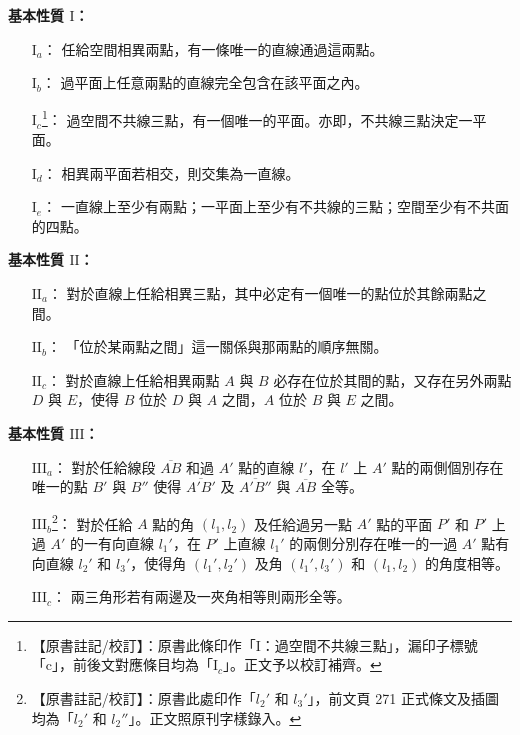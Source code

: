 \noindent\textbf{基本性質 $\mathrm{I}$：}
\begin{itemize}[leftmargin=2.8em, itemsep=0.2em]
  \item[$\mathrm{I}_a$：]任給空間相異兩點，有一條唯一的直線通過這兩點。
  \item[$\mathrm{I}_b$：]過平面上任意兩點的直線完全包含在該平面之內。
  \item[$\mathrm{I}_c$\phantomsection\label{note:b3-a1-p277-ic}\footnote{【原書註記/校訂】：原書此條印作「$\mathrm{I}$：過空間不共線三點」，漏印子標號「c」，前後文對應條目均為「$\mathrm{I}_c$」。正文予以校訂補齊。}：]過空間不共線三點，有一個唯一的平面。亦即，不共線三點決定一平面。
  \item[$\mathrm{I}_d$：]相異兩平面若相交，則交集為一直線。
  \item[$\mathrm{I}_e$：]一直線上至少有兩點；一平面上至少有不共線的三點；空間至少有不共面的四點。
\end{itemize}

\noindent\textbf{基本性質 $\mathrm{II}$：}
\begin{itemize}[leftmargin=2.8em, itemsep=0.2em]
  \item[$\mathrm{II}_a$：]對於直線上任給相異三點，其中必定有一個唯一的點位於其餘兩點之間。
  \item[$\mathrm{II}_b$：]「位於某兩點之間」這一關係與那兩點的順序無關。
  \item[$\mathrm{II}_c$：]對於直線上任給相異兩點 $A$ 與 $B$ 必存在位於其間的點，又存在另外兩點 $D$ 與 $E$，使得 $B$ 位於 $D$ 與 $A$ 之間，$A$ 位於 $B$ 與 $E$ 之間。
\end{itemize}

\noindent\textbf{基本性質 $\mathrm{III}$：}
\begin{itemize}[leftmargin=2.8em, itemsep=0.2em]
  \item[$\mathrm{III}_a$：]對於任給線段 $\overline{AB}$ 和過 $A'$ 點的直線 $l'$，在 $l'$ 上 $A'$ 點的兩側個別存在唯一的點 $B'$ 與 $B''$ 使得 $\overline{A'B'}$ 及 $\overline{A'B''}$ 與 $\overline{AB}$ 全等。
  \item[$\mathrm{III}_b$\phantomsection\label{note:b3-a1-p278-l3p}\footnote{【原書註記/校訂】：原書此處印作「$l_2'$ 和 $l_3'$」，前文頁 271 正式條文及插圖均為「$l_2'$ 和 $l_2''$」。正文照原刊字樣錄入。}：]對於任給 $A$ 點的角 $(l_1, l_2)$ 及任給過另一點 $A'$ 點的平面 $P'$ 和 $P'$ 上過 $A'$ 的一有向直線 $l_1'$，在 $P'$ 上直線 $l_1'$ 的兩側分別存在唯一的一過 $A'$ 點有向直線 $l_2'$ 和 $l_3'$，使得角 $(l_1', l_2')$ 及角 $(l_1', l_3')$ 和 $(l_1, l_2)$ 的角度相等。
  \item[$\mathrm{III}_c$：]兩三角形若有兩邊及一夾角相等則兩形全等。
\end{itemize}

